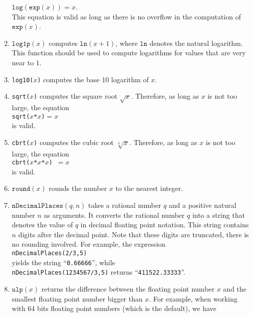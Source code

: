 \begin{enumerate}
      $\mathtt{log}(\mathtt{exp}(x)) = x$.
      \\[0.2cm]
      This equation is valid as long as there is no overflow in the computation of
      $\mathtt{exp}(x)$.
\item $\mathtt{log1p}(x)$ computes $\mathtt{ln}(x + 1)$, where $\mathtt{ln}$ denotes the natural
      logarithm.  This function should be used to compute logarithms for values that are very near
      to $1$.
\item \texttt{log10($x$)} computes the base 10 logarithm of $x$.
\item \texttt{sqrt($x$)} computes the square root $\sqrt{x}$.  Therefore, as long as $x$
      is not too large, the equation
      \\[0.2cm]
      \hspace*{1.3cm}
      \texttt{sqrt($x$*$x$)$=x$}
      \\[0.2cm]
      is valid.
\item \texttt{cbrt($x$)} computes the cubic root $\sqrt[3]{x}$.  Therefore, as long as $x$
      is not too large, the equation
      \\[0.2cm]
      \hspace*{1.3cm}
      \texttt{cbrt($x$*$x$*$x$) $= x$}
      \\[0.2cm]
      is valid.
\item $\texttt{round}(x)$ rounds the number $x$ to the nearest integer.
\item $\texttt{nDecimalPlaces}(q, n)$ takes a rational number $q$ and a positive natural
      number $n$ as arguments.  It converts the rational number $q$ into a string that denotes the
      value of $q$ in decimal floating point notation.  This string contains $n$ digits after the
      decimal point.  Note that these digits are truncated, there is no rounding
      involved.  For example, the expression
      \\[0.2cm]
      \hspace*{1.3cm}
      \texttt{nDecimalPlaces(2/3,5)}
      \\[0.2cm]
      yields the string ``\texttt{0.66666}'', while 
      \\[0.2cm]
      \hspace*{1.3cm}
      \texttt{nDecimalPlaces(1234567/3,5)} returns ``\texttt{411522.33333}''.
\item $\mathtt{ulp}(x)$  returns the difference between the floating point number $x$ and
      the smallest floating point number bigger than $x$.  For example, when working with
      64 bits floating point numbers (which is the default), we have

\end{enumerate}
